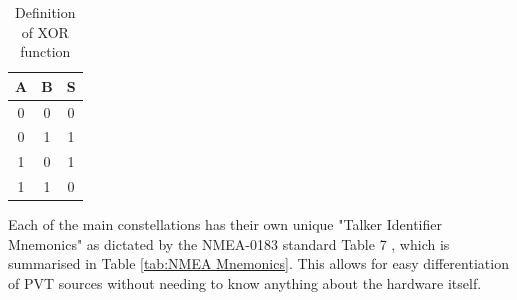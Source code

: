 \renewcommand{\arraystretch}{1.5}
\begin{table}
    \begin{center}
        \caption{Definition of XOR function}
        \label{tab:XOR}
        \begin{tabular}{ c|c||c }
            \hline
            \textbf{A} & \textbf{B} & \textbf{S}\\
            \hline
            0 & 0 & 0 \\
            0 & 1 & 1 \\
            1 & 0 & 1 \\
            1 & 1 & 0 \\
            \hline
        \end{tabular}
    \end{center}
\end{table}
\renewcommand{\arraystretch}{1}

Each of the main constellations has their own unique "Talker Identifier Mnemonics" as dictated by the NMEA-0183 standard Table 7 \cite{RN71}, which is summarised 
in Table \ref{tab:NMEA Mnemonics}. This allows for easy differentiation of PVT sources without needing to know anything about the hardware itself.


